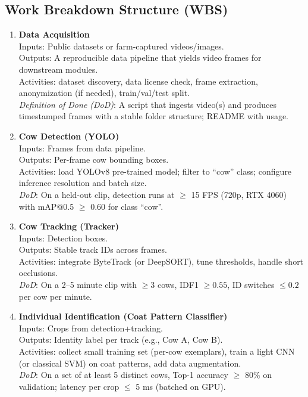 \documentclass{article}
\begin{document}
\subsection*{Work Breakdown Structure (WBS)}
\begin{enumerate}
  \item \textbf{Data Acquisition} \\
  Inputs: Public datasets or farm-captured videos/images. \\
  Outputs: A reproducible data pipeline that yields video frames for downstream modules. \\
  Activities: dataset discovery, data license check, frame extraction, anonymization (if needed), train/val/test split. \\
  \emph{Definition of Done (DoD)}: A script that ingests video(s) and produces timestamped frames with a stable folder structure; README with usage.

  \item \textbf{Cow Detection (YOLO)} \\
  Inputs: Frames from data pipeline. \\
  Outputs: Per-frame cow bounding boxes. \\
  Activities: load YOLOv8 pre-trained model; filter to ``cow'' class; configure inference resolution and batch size. \\
  \emph{DoD}: On a held-out clip, detection runs at $\geq$ 15 FPS (720p, RTX 4060) with mAP@0.5 $\geq$ 0.60 for class ``cow''.

  \item \textbf{Cow Tracking (Tracker)} \\
  Inputs: Detection boxes. \\
  Outputs: Stable track IDs across frames. \\
  Activities: integrate ByteTrack (or DeepSORT), tune thresholds, handle short occlusions. \\
  \emph{DoD}: On a 2--5 minute clip with $\geq 3$ cows, IDF1 $\geq 0.55$, ID switches $\leq 0.2$ per cow per minute.

  \item \textbf{Individual Identification (Coat Pattern Classifier)} \\
  Inputs: Crops from detection+tracking. \\
  Outputs: Identity label per track (e.g., Cow A, Cow B). \\
  Activities: collect small training set (per-cow exemplars), train a light CNN (or classical SVM) on coat patterns, add data augmentation. \\
  \emph{DoD}: On a set of at least 5 distinct cows, Top-1 accuracy $\geq$ 80\% on validation; latency per crop $\leq$ 5 ms (batched on GPU).


\end{enumerate}
\end{document}
